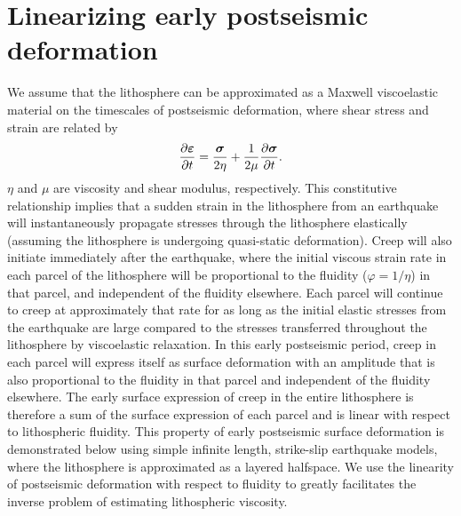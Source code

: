 \documentclass[extra]{gji}
\begin{document}
\section{Linearizing early postseismic deformation} 
We assume that the lithosphere can be approximated as a Maxwell
viscoelastic material on the timescales of postseismic deformation,
where shear stress and strain are related by
\begin{equation}
  \frac{\partial\mitbf{\varepsilon}}{\partial t}=\frac{\mitbf{\sigma}}{2\eta} + 
                              \frac{1}{2\mu}\frac{\partial\mitbf{\sigma}}{\partial t}.
\end{equation}
$\eta$ and $\mu$ are viscosity and shear modulus, respectively.  This
constitutive relationship implies that a sudden strain in the
lithosphere from an earthquake will instantaneously propagate stresses
through the lithosphere elastically (assuming the lithosphere is
undergoing quasi-static deformation).  Creep will also initiate
immediately after the earthquake, where the initial viscous strain
rate in each parcel of the lithosphere will be proportional to the
fluidity ($\varphi=1/\eta$) in that parcel, and independent of the
fluidity elsewhere.  Each parcel will continue to creep at
approximately that rate for as long as the initial elastic stresses
from the earthquake are large compared to the stresses transferred
throughout the lithosphere by viscoelastic relaxation.  In this early
postseismic period, creep in each parcel will express itself as
surface deformation with an amplitude that is also proportional to the
fluidity in that parcel and independent of the fluidity elsewhere.
The early surface expression of creep in the entire lithosphere is
therefore a sum of the surface expression of each parcel and is linear
with respect to lithospheric fluidity.  This property of early
postseismic surface deformation is demonstrated below using simple
infinite length, strike-slip earthquake models, where the lithosphere
is approximated as a layered halfspace.  We use the linearity of
postseismic deformation with respect to fluidity to greatly
facilitates the inverse problem of estimating lithospheric viscosity.
\end{document}
